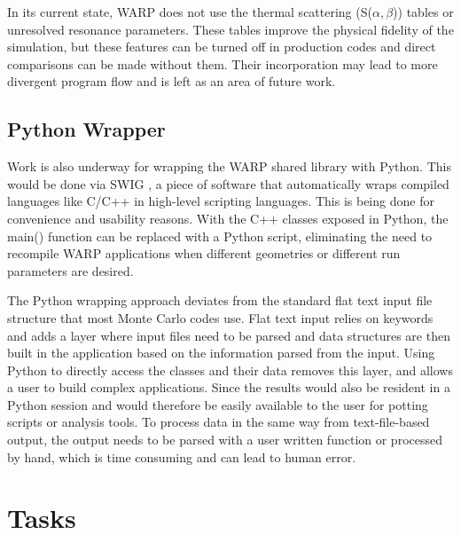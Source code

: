In its current state, WARP does not use the thermal scattering (S($\alpha,$$\beta$)) tables or unresolved resonance parameters.   These tables improve the physical fidelity of the simulation, but these features can be turned off in production codes and direct comparisons can be made without them.  Their incorporation may lead to more divergent program flow and is left as an area of future work.

\subsection{Python Wrapper}

Work is also underway for wrapping the WARP shared library with Python.  This would be done via SWIG \cite{swig}, a piece of software that automatically wraps compiled languages like C/C++ in high-level scripting languages.  This is being done for convenience and usability reasons.  With the C++ classes exposed in Python, the main() function can be replaced with a Python script, eliminating the need to recompile WARP applications when different geometries or different run parameters are desired. %

The Python wrapping approach deviates from the standard flat text input file structure that most Monte Carlo codes use.  Flat text input relies on keywords and adds a layer where input files need to be parsed and data structures are then built in the application based on the information parsed from the input.  Using Python to directly access the classes and their data removes this layer, and allows a user to build complex applications.  Since the results would also be resident in a Python session and would therefore be easily available to the user for potting scripts or analysis tools.  To process data in the same way from text-file-based output, the output needs to be parsed with a user written function or processed by hand, which is time consuming and can lead to human error.


\section{Tasks}
\label{sec:tasks}

